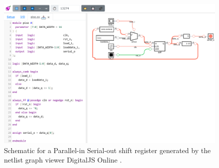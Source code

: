 
\begin{figure}[t]
    \centering
    \includegraphics[width=\linewidth]{media/graphics/digitaljs_online.pdf}
    \caption[
        DigitalJS Online Example
    ]{
        Schematic for a Parallel-in Serial-out shift register generated by the netlist graph viewer DigitalJS Online \cite{DigitalJSOnline}.
    }
    \label{fig:digitaljs_online}
\end{figure}
